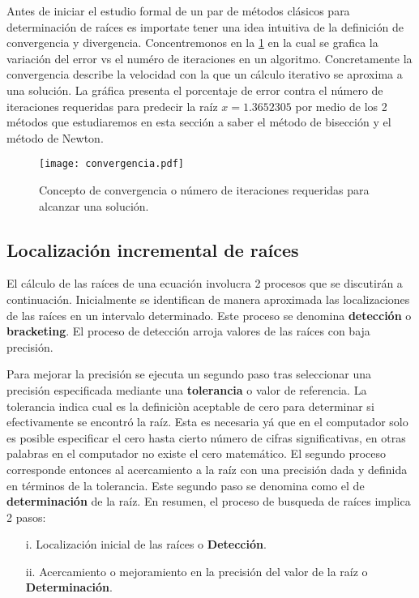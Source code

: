 Antes de iniciar el estudio formal de un par de métodos clásicos para determinación de raíces es importate tener una idea intuitiva de la definición de convergencia y divergencia. Concentremonos en la \cref{fig:raizconverge} en la cual se grafica la variación del error vs el numéro de iteraciones en un algoritmo. Concretamente la convergencia describe la velocidad con la que un cálculo iterativo se aproxima a una solución. La gráfica presenta el porcentaje de error contra el número de iteraciones requeridas para predecir la raíz $x=1.3652305$ por medio de los 2 métodos que estudiaremos en esta sección a saber el método de bisección y el método de Newton.

\begin{figure}[H]
  \centering
  \texttt{[image: convergencia.pdf]}
  \caption{Concepto de convergencia o número de iteraciones requeridas para alcanzar una solución.}
  \label{fig:raizconverge}
\end{figure}
	

\subsection{Localización incremental de raíces}

El cálculo de las raíces de una ecuación involucra 2 procesos que se discutirán a continuación. Inicialmente se identifican de manera aproximada las localizaciones de las raíces en un intervalo determinado. Este proceso se denomina {\bf detección} o {\bf bracketing}. El proceso de detección arroja valores de las raíces con baja precisión.

Para mejorar la precisión se ejecuta un segundo paso tras seleccionar una precisión especificada mediante una {\bf tolerancia} o valor de referencia. La tolerancia indica cual es la definiciòn aceptable de cero para determinar si efectivamente se encontró la raíz. Esta es necesaria yá que en el computador solo es posible especificar el cero hasta cierto número de cifras significativas, en otras palabras en el computador no existe el cero matemático. El segundo proceso corresponde entonces al acercamiento a la raíz con una precisión dada y definida en términos de la tolerancia. Este segundo paso se denomina como el de {\bf determinación} de la raíz.  En resumen, el proceso de busqueda de raíces implica 2 pasos:

\begin{itemize}
	\item[i.] Localización inicial de las raíces o {\bf Detección}.
	\item[ii.] Acercamiento o mejoramiento en la precisión del valor de la raíz o {\bf Determinación}.
\end{itemize}

